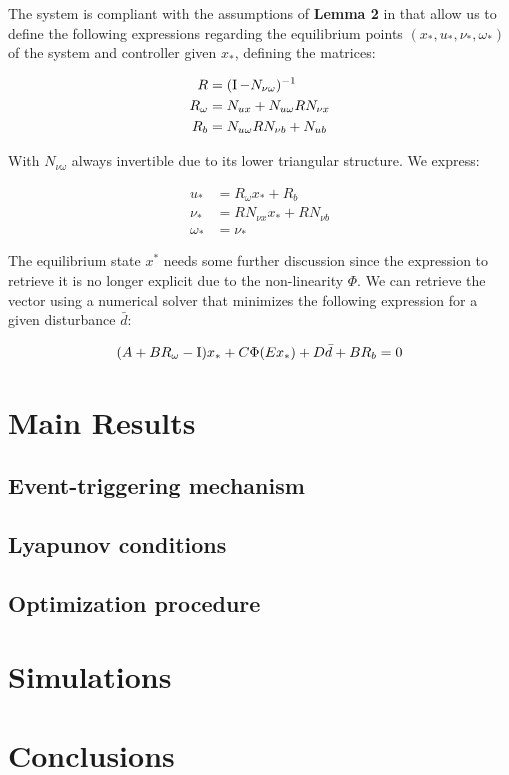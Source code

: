 \documentclass{article}
\begin{document}
The system is compliant with the assumptions of \textbf{Lemma 2} in \cite{css-extended} that allow us to define the following expressions regarding the equilibrium points $\left( x_*, u_*, \nu_*, \omega_* \right)$ of the system and controller given $x_*$, defining the matrices:

\begin{equation}
    \begin{aligned}
         R &= (\operatorname{I} - N_{\nu \omega})^{-1}\\
         R_{\omega} &= N_{u x} + N_{u \omega} R N_{\nu x}\\
         R_b &= N_{u \omega} R N_{\nu b} + N_{u b}
    \end{aligned}
\end{equation}

With $N_{\nu \omega}$ always invertible due to its lower triangular structure. We express:

\begin{equation}
  \begin{aligned}
    u_* &= R_{\omega} x_* + R_b\\
    \nu_* &= R N_{\nu x} x_* + R N_{\nu b}\\
    \omega_* &= \nu_*
  \end{aligned}
\end{equation}

The equilibrium state $x^*$ needs some further discussion since the expression to retrieve it is no longer explicit due to the non-linearity $\Phi$. We can retrieve the vector using a numerical solver that minimizes the following expression for a given disturbance $\bar{d}$: 

\begin{equation}
  (A + B R_{\omega} - \operatorname{I}) x_* + C \Phi(E x_*) + D \bar{d} + B R_b = 0
\end{equation}

\section{Main Results}

\subsection{Event-triggering mechanism}

\subsection{Lyapunov conditions}

\subsection{Optimization procedure}

\section{Simulations}

\section{Conclusions}

\printbibliography
\end{document}
